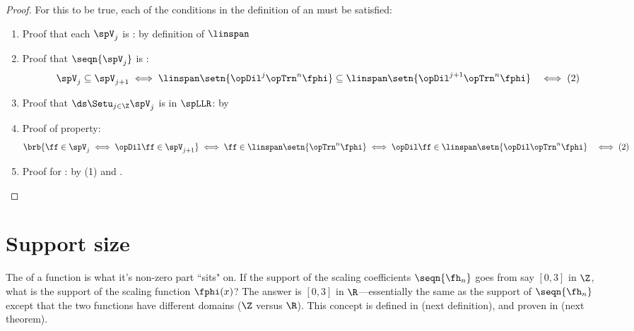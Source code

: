 \begin{proof}
For this to be true, each of the conditions in the definition of an   must be satisfied:
\begin{enumerate}
  \item Proof that each $\spV_j$ is : by definition of $\linspan$

  \item Proof that $\seqn{\spV_j}$ is : 
    \begin{align*}
      \spV_j\subseteq\spV_{j+1}
        &\iff \linspan\setn{\opDil^j\opTrn^n\fphi}\subseteq\linspan\setn{\opDil^{j+1}\opTrn^n\fphi}
        &\iff (2)
    \end{align*}

  \item Proof that $\ds\Setu_{j\in\Z}\spV_j$ is  in $\spLLR$: by 
  
  \item Proof of  property:
    \begin{align*}
      \brb{\ff\in\spV_j\iff\opDil\ff\in\spV_{j+1}}
        &\iff \ff\in\linspan\setn{\opTrn^n\fphi}\iff\opDil\ff\in\linspan\setn{\opDil\opTrn^n\fphi}
        &\iff (2)
    \end{align*}

  \item Proof for : by (1) and .
\end{enumerate}
\end{proof}

\section{Support size}
The  of a function is what it's non-zero part ``sits" on.
If the support of the scaling coefficients $\seqn{\fh_n}$ goes from say
$[0,3]$ in $\Z$, what is the support of the scaling function $\fphi(x)$?
The answer is $[0,3]$ in $\R$---essentially the same
as the support of $\seqn{\fh_n}$ except that the two functions have different
domains ($\Z$ versus $\R$).
This concept is defined in  (next definition),
and proven in  (next theorem).


